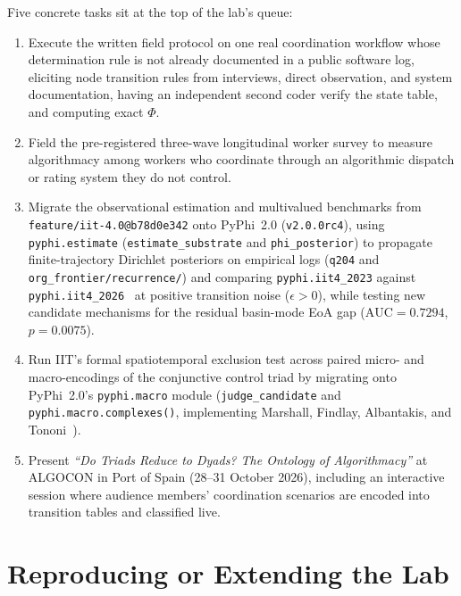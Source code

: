 \documentclass[11pt,a4paper]{article}
\begin{document}
Five concrete tasks sit at the top of the lab's queue:
\begin{enumerate}[leftmargin=1.8em,itemsep=0.2em]
  \item Execute the written field protocol on one real coordination workflow whose determination rule is not already documented in a public software log, eliciting node transition rules from interviews, direct observation, and system documentation, having an independent second coder verify the state table, and computing exact $\Phi$.
  \item Field the pre-registered three-wave longitudinal worker survey to measure algorithmacy among workers who coordinate through an algorithmic dispatch or rating system they do not control.
  \item Migrate the observational estimation and multivalued benchmarks from \texttt{feature/iit-4.0@b78d0e342} onto PyPhi~2.0 (\texttt{v2.0.0rc4}), using \texttt{pyphi.estimate} (\texttt{estimate\_substrate} and \texttt{phi\_posterior}) to propagate finite-trajectory Dirichlet posteriors on empirical logs (\texttt{q204} and \texttt{org\_frontier/recurrence/}) and comparing \texttt{pyphi.iit4\_2023} against \texttt{pyphi.iit4\_2026}~\cite{mayner2026intrinsic} at positive transition noise ($\epsilon > 0$), while testing new candidate mechanisms for the residual basin-mode EoA gap ($\mathrm{AUC} = 0.7294$, $p = 0.0075$).
  \item Run IIT's formal spatiotemporal exclusion test across paired micro- and macro-encodings of the conjunctive control triad by migrating onto PyPhi~2.0's \texttt{pyphi.macro} module (\texttt{judge\_candidate} and \texttt{pyphi.macro.complexes()}, implementing Marshall, Findlay, Albantakis, and Tononi~\cite{marshall2026intrinsic}).
  \item Present \emph{``Do Triads Reduce to Dyads? The Ontology of Algorithmacy''} at ALGOCON in Port of Spain (28--31 October 2026), including an interactive session where audience members' coordination scenarios are encoded into transition tables and classified live.
\end{enumerate}

\section{Reproducing or Extending the Lab}
\end{document}
